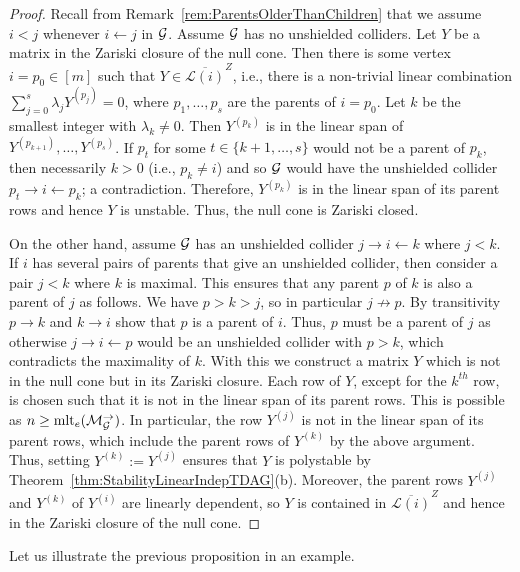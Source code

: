 \begin{proof}
		Recall from Remark~\ref{rem:ParentsOlderThanChildren} that we assume $i < j$ whenever $i \leftarrow j$ in $\mathcal{G}$. Assume $\mathcal{G}$ has no unshielded colliders. Let $Y$ be a matrix in the Zariski closure of the null cone. Then there is some vertex $i = p_0 \in [m]$ such that $Y \in \overline{\mathcal{L}(i)}^{Z}$, i.e., there is a non-trivial linear combination $\sum_{j=0}^s \lambda_j Y^{(p_j)} = 0$, where $p_1,\ldots, p_s$ are the parents of $i = p_0$. Let $k$ be the smallest integer with $\lambda_k \neq 0$. Then $Y^{(p_k)}$ is in the linear span of $Y^{(p_{k+1})}, \ldots, Y^{(p_s)}$. If $p_t$ for some $t \in \{k+1,\ldots,s\}$ would not be a parent of $p_k$, then necessarily $k>0$ (i.e., $p_k \neq i$) and so $\mathcal{G}$ would have the unshielded collider $p_t \to i \leftarrow p_k$; a contradiction. Therefore, $Y^{(p_k)}$ is in the linear span of its parent rows and hence $Y$ is unstable. Thus, the null cone is Zariski closed.
		
		On the other hand, assume $\mathcal{G}$ has an unshielded collider $j \to i \leftarrow k$ where $j < k$. If $i$ has several pairs of parents that give an unshielded collider, then consider a pair $j < k$ where $k$ is maximal. This ensures that any parent $p$ of $k$ is also a parent of $j$ as follows. We have $p > k > j$, so in particular $j \not\to p$. By transitivity $p \to k$ and $k \to i$ show that $p$ is a parent of $i$. Thus, $p$ must be a parent of $j$ as otherwise $j \to i \leftarrow p$ would be an unshielded collider with $p > k$, which contradicts the maximality of $k$. With this we construct a matrix $Y$ which is not in the null cone but in its Zariski closure. Each row of $Y$, except for the $k^{th}$ row, is chosen such that it is not in the linear span of its parent rows. This is possible as $n \geq \operatorname{mlt}_e(\mathcal{M}_{\mathcal{G}}^{\to})$. In particular, the row $Y^{(j)}$ is not in the linear span of its parent rows, which include the parent rows of $Y^{(k)}$ by the above argument. Thus, setting $Y^{(k)} := Y^{(j)}$ ensures that $Y$ is polystable by Theorem~\ref{thm:StabilityLinearIndepTDAG}(b). Moreover, the parent rows $Y^{(j)}$ and $Y^{(k)}$ of $Y^{(i)}$ are linearly dependent, so $Y$ is contained in $\overline{\mathcal{L}(i)}^{Z}$ and hence in the Zariski closure of the null cone.
\end{proof}

Let us illustrate the previous proposition in an example.

